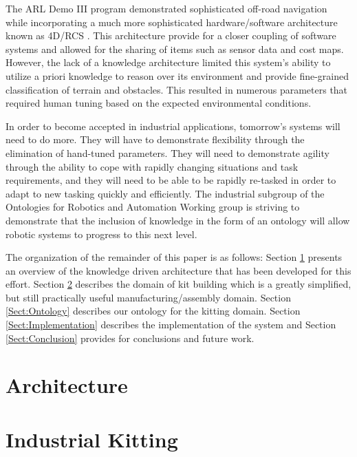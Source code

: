 \documentclass[preprint,12pt]{elsarticle}
\begin{document}
The ARL Demo III program demonstrated sophisticated off-road navigation while incorporating a much more sophisticated
hardware/software architecture known as 4D/RCS \cite{Albus2000}. This
architecture provide for a closer coupling of software systems and allowed for the sharing of items such as sensor data and cost maps.
However, the lack of a knowledge architecture limited this system\rq{}s ability to utilize a priori knowledge to reason over its environment
and provide fine-grained classification of terrain and obstacles. This resulted in numerous parameters that required human tuning based on
the expected environmental conditions.

In order to become accepted in industrial applications, tomorrow\rq{}s systems will need to do more. They will have to demonstrate flexibility through the
elimination of hand-tuned parameters. They will need to demonstrate agility through the ability to cope with rapidly changing situations and task requirements,
and they will need to be able to be rapidly re-tasked in order to adapt to new tasking quickly and efficiently. The  industrial subgroup of the
Ontologies for Robotics and Automation Working group is striving to demonstrate that the inclusion of knowledge in the form of an ontology
will allow robotic systems to progress to this next level.

The organization of the remainder of this paper is as follows: Section \ref{Sect:Architecture} presents an overview of the knowledge driven architecture that
has been developed for this effort. Section \ref{Sect:Kitting} describes the domain of kit building
which is a greatly simplified, but still practically useful manufacturing/assembly domain. Section \ref{Sect:Ontology} describes our ontology for the kitting
domain. Section \ref{Sect:Implementation} describes the implementation of the system and Section \ref{Sect:Conclusion} provides for conclusions and
future work.


\section{Architecture}
\label{Sect:Architecture}


\section{Industrial Kitting}
\label{Sect:Kitting}


\end{document}

